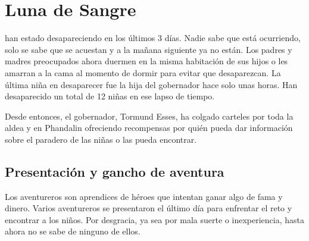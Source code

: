 \documentclass[10pt,twoside,twocolumn,openany]{dndbook}
\begin{document}



\chapter*{Luna de Sangre}

 han estado desapareciendo en los 
últimos 3 días. Nadie sabe que está ocurriendo, solo se sabe que se acuestan y a la mañana 
siguiente ya no están. Los padres y madres preocupados ahora duermen en la misma habitación de
sus hijos o les amarran a la cama al momento de dormir para evitar que desaparezcan. La última 
niña en desaparecer fue la hija del gobernador hace solo unas horas. Han desaparecido un total de 
12 niñas en ese lapso de tiempo.

Desde entonces, el gobernador, Tormund Esses, ha colgado carteles por toda la aldea y en Phandalin 
ofreciendo recompensas por quién pueda dar información sobre el paradero de las niñas o las pueda 
encontrar.

\section{Presentación y gancho de aventura}

Los aventureros son aprendices de héroes que intentan ganar algo de fama y dinero. Varios aventureros 
se presentaron el último día para enfrentar el reto y encontrar a los niños. Por desgracia, ya sea 
por mala suerte o inexperiencia, hasta ahora no se sabe de ninguno de ellos.
\end{document}
